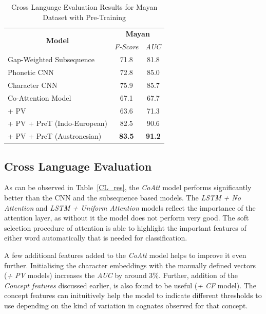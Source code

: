 \documentclass[11pt,letterpaper]{article}
\begin{document}
\begin{table}[t]
\centering
\begin{tabular}{lcc}
\multicolumn{1}{c}{\multirow{2}{*}{\textbf{Model}}} & \multicolumn{2}{c}{\textbf{Mayan}} \\ \cline{2-3} 
\multicolumn{1}{c}{}                                & \textit{F-Score}  & \textit{AUC}   \\ \hline
Gap-Weighted Subsequence                            & 71.8              & 81.8           \\
Phonetic CNN                                        & 72.8              & 85.0           \\
Character CNN                                       & 75.9              & 85.7           \\ \hline
Co-Attention Model                                  & 67.1              & 67.7           \\
\quad + PV                                          & 63.6              & 71.3           \\
\quad + PV + PreT (Indo-European)                   & 82.5              & 90.6           \\
\quad + PV + PreT (Austronesian)                    & \textbf{83.5}     & \textbf{91.2} 
\end{tabular}
\caption{Cross Language Evaluation Results for Mayan Dataset with Pre-Training }
\label{CL_res_2}
\end{table}
\subsection{Cross Language Evaluation}

As can be observed in Table~\ref{CL_res}, the \textit{CoAtt} model performs significantly better than the CNN and the subsequence based models. The \textit{LSTM + No Attention} and \textit{LSTM + Uniform Attention} models reflect the importance of the attention layer, as without it the model does not perform very good. The soft selection procedure of attention is able to highlight the important features of either word automatically that is needed for classification. 

A few additional features added to the \textit{CoAtt} model helps to improve it even further. Initialising the character embeddings with the manually defined vectors (\textit{+ PV} models) increases the \textit{AUC} by around 3\%. Further, addition of the \textit{Concept features} discussed earlier, is also found to be useful (\textit{+ CF} model). The concept features can inituitively help the model to indicate different thresholds to use depending on the kind of variation in cognates observed for that concept.
\end{document}
